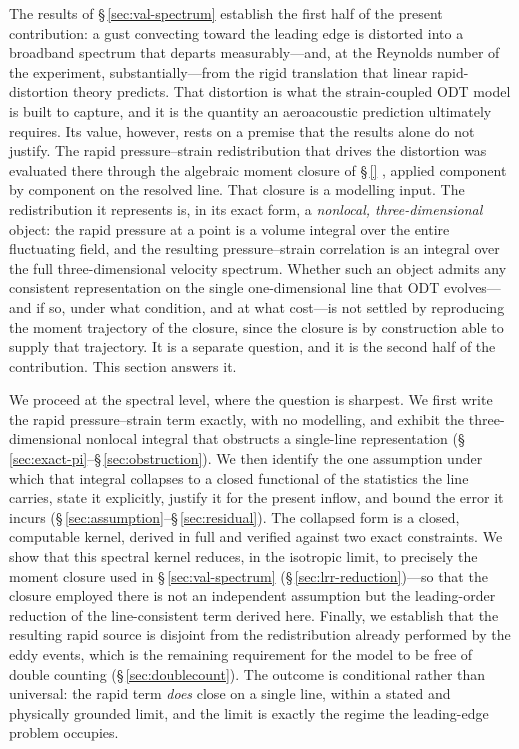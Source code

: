 \documentclass[lineno]{JFM-FLM_Au}
\newcounter{assumption}
\begin{document}
The results of \S\,\ref{sec:val-spectrum} establish the first half of the
present contribution: a gust convecting toward the leading edge is distorted
into a broadband spectrum that departs measurably---and, at the Reynolds number
of the experiment, substantially---from the rigid translation that linear
rapid-distortion theory predicts. That distortion is what the strain-coupled
ODT model is built to capture, and it is the quantity an aeroacoustic
prediction ultimately requires. Its value, however, rests on a premise that the
results alone do not justify. The rapid pressure--strain redistribution that
drives the distortion was evaluated there through the algebraic moment closure
of \S\,\ref{}%
\citep{LaunderReeceRodi1975}, applied component by component on the resolved
line. That closure is a modelling input. The redistribution it represents is,
in its exact form, a \emph{nonlocal, three-dimensional} object: the rapid
pressure at a point is a volume integral over the entire fluctuating field, and
the resulting pressure--strain correlation is an integral over the full
three-dimensional velocity spectrum. Whether such an object admits any
consistent representation on the single one-dimensional line that ODT
evolves---and if so, under what condition, and at what cost---is not settled by
reproducing the moment trajectory of the closure, since the closure is by
construction able to supply that trajectory. It is a separate question, and it
is the second half of the contribution. This section answers it.

We proceed at the spectral level, where the question is sharpest. We first
write the rapid pressure--strain term exactly, with no modelling, and exhibit
the three-dimensional nonlocal integral that obstructs a single-line
representation (\S\,\ref{sec:exact-pi}--\S\,\ref{sec:obstruction}). We then
identify the one assumption under which that integral collapses to a closed
functional of the statistics the line carries, state it explicitly, justify it
for the present inflow, and bound the error it incurs
(\S\,\ref{sec:assumption}--\S\,\ref{sec:residual}). The collapsed form is a
closed, computable kernel, derived in full and verified against two exact
constraints. We show that this spectral kernel reduces, in the isotropic limit,
to precisely the moment closure used in \S\,\ref{sec:val-spectrum}
(\S\,\ref{sec:lrr-reduction})---so that the closure employed there is not an
independent assumption but the leading-order reduction of the line-consistent
term derived here. Finally, we establish that the resulting rapid source is
disjoint from the redistribution already performed by the eddy events, which is
the remaining requirement for the model to be free of double counting
(\S\,\ref{sec:doublecount}). The outcome is conditional rather than universal:
the rapid term \emph{does} close on a single line, within a stated and
physically grounded limit, and the limit is exactly the regime the
leading-edge problem occupies.
\end{document}

